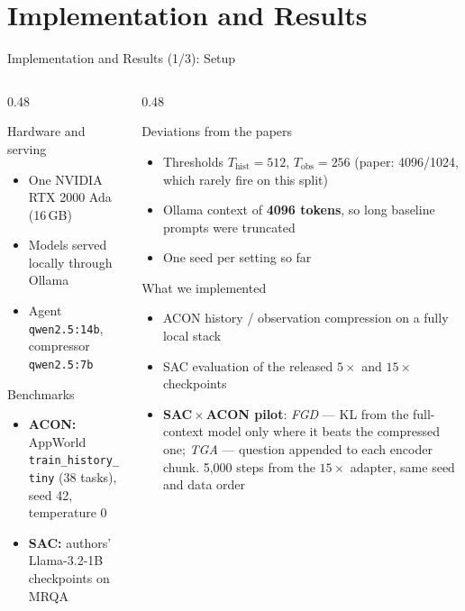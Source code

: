 \documentclass[aspectratio=169,10pt]{beamer}
\begin{document}
\section{Implementation and Results}
\begin{frame}{Implementation and Results (1/3): Setup}
\begin{columns}[T]
\begin{column}{0.48\textwidth}
\begin{block}{Hardware and serving}
\footnotesize
\begin{itemize}
  \item One NVIDIA RTX 2000 Ada (16\,GB)
  \item Models served locally through Ollama
  \item Agent \texttt{qwen2.5:14b}, compressor \texttt{qwen2.5:7b}
\end{itemize}
\end{block}
\begin{block}{Benchmarks}
\footnotesize
\begin{itemize}
  \item \textbf{ACON:} AppWorld \texttt{train\_history\_tiny} (38 tasks),
        seed 42, temperature 0
  \item \textbf{SAC:} authors' Llama-3.2-1B checkpoints on MRQA
\end{itemize}
\end{block}
\end{column}
\begin{column}{0.48\textwidth}
\begin{alertblock}{Deviations from the papers}
\footnotesize
\begin{itemize}
  \item Thresholds $T_{\mathrm{hist}}{=}512$, $T_{\mathrm{obs}}{=}256$
        (paper: 4096/1024, which rarely fire on this split)
  \item Ollama context of \textbf{4096 tokens}, so long baseline prompts
        were truncated
  \item One seed per setting so far
\end{itemize}
\end{alertblock}
\begin{block}{What we implemented}
\footnotesize
\begin{itemize}
  \item ACON history / observation compression on a fully local stack
  \item SAC evaluation of the released $5\times$ and $15\times$ checkpoints
  \item \textbf{SAC\,$\times$\,ACON pilot}: \emph{FGD} --- KL from the
        full-context model only where it beats the compressed one;
        \emph{TGA} --- question appended to each encoder chunk.
        5,000 steps from the $15\times$ adapter, same seed and data order
\end{itemize}
\end{block}
\end{column}
\end{columns}
\end{frame}
\end{document}
